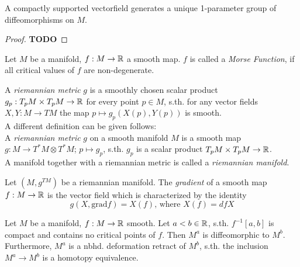 \documentclass[a4paper,11pt]{article}
\begin{document}
\begin{lemma}
   \label{lemma:vectorfields generate 1-parameter groups}
   A compactly supported vectorfield generates a unique 1-parameter group of diffeomorphisms on $M$.
\end{lemma}

\begin{proof}
   \textbf{TODO}
\end{proof}

\begin{definition}
   \label{def:morse function}

   Let $M$ be a manifold, $f:M \rightarrow {\mathbb R}$ a smooth map. $f$ is called a \textit{Morse Function},
   if all critical values of $f$ are non-degenerate.   
\end{definition}

\begin{definition}
   \label{def:riemannian metric}
   A \textit{riemannian metric} $g$ is a smoothly chosen scalar product $g_p: T_pM \times T_pM \rightarrow {\mathbb R}$
   for every point $p \in M$, s.th. for any vector fields $ X, Y: M \rightarrow TM $ the map 
   $ p \mapsto g_p(X(p), Y(p)) $ is smooth. \\
   A different definition can be given follows: \\
   A \textit{riemannian metric} $g$ on a smooth manifold $M$ is a smooth map $g: M \rightarrow T^*M \otimes T^*M$; $p \mapsto g_p$,
   s.th. $g_p$ is a scalar product $T_pM \times T_pM \rightarrow {\mathbb R}$. \\
   A manifold together with a riemannian metric is called a \textit{riemannian manifold}.
\end{definition}

\begin{definition}[gradient]
   \label{def:gradient}
   Let $(M, g^{TM})$ be a riemannian manifold. The \textit{gradient} of a smooth map $f: M \rightarrow {\mathbb R}$ is the vector field
   which is characterized by the identity 
   \[ g(X, \text{grad} f) = X(f) \text{, where } X(f) = dfX \]
\end{definition}

\begin{theorem}
   \label{theorem:1st deformation lemma}
   Let $M$ be a manifold, $f: M \rightarrow {\mathbb R}$ smooth. Let $a < b \in {\mathbb R}$, s.th. 
   $f^{-1}[a, b]$ is compact and contains no critical points of $f$. Then $M^a$ is diffeomorphic
   to $M^b$. \\ 
   Furthermore, $M^a$ is a nbhd. deformation retract of $M^b$, s.th. the inclusion
   $M^a \rightarrow M^b$ is a homotopy equivalence.
\end{theorem}
\end{document}
